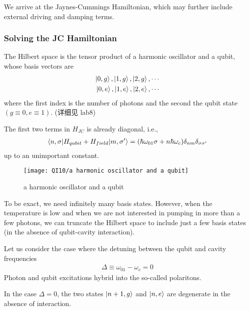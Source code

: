 We arrive at the Jaynes-Cummings Hamiltonian, which may further include external driving and damping terms.

\subsubsection{Solving the JC Hamiltonian}
The Hilbert space is the tensor product of a harmonic oscillator and a qubit, whose basis vectors are
\begin{align*}
    \ket{0, g}, \ket{1, g}, \ket{2, g}, \cdots\\
    \ket{0, e}, \ket{1, e}, \ket{2, e}, \cdots
\end{align*}
where the first index is the number of photons and the second the qubit state $(g \equiv 0, e \equiv 1)$. (详细见 lab8)

The first two terms in $H_{JC}$ is already diagonal, i.e.,
\begin{align*}
    \braket{n, \sigma | H_{qubit}+H_{field} |m, \sigma'}=(\hbar \omega_{01}\sigma+n\hbar\omega_c)\delta_{nm}\delta_{\sigma\sigma'}
\end{align*}
up to an unimportant constant. 

\begin{figure}[!htb]
    \centering
    \texttt{[image: QI10/a harmonic oscillator and a qubit]}
    \caption{a harmonic oscillator and a qubit}
\end{figure}

To be exact, we need infinitely many basis states. However, when the temperature is low and when we are not interested in pumping in more than a few photons, we can truncate the Hilbert space to include just a few basis states (in the absence of qubit-cavity interaction). 

Let us consider the case where the detuning between the qubit and cavity frequencies
\begin{align*}
    \Delta\equiv \omega_{01}-\omega_c=0
\end{align*}
Photon and qubit excitations hybrid into the so-called polaritons.

In the case $\Delta = 0$, the two states $\ket{n + 1, g}$ and $\ket{n, e}$ are degenerate in the absence of interaction. 

